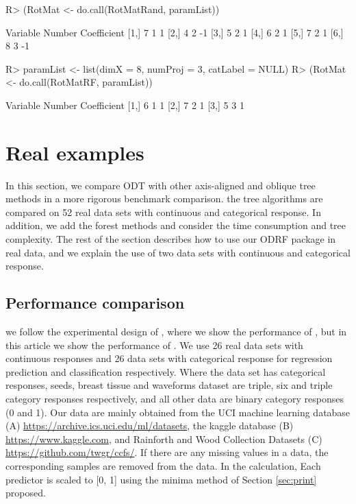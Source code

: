 \documentclass[nojss]{jss}
\numberwithin{equation}{section}
\begin{document}
\begin{Schunk}
\begin{Sinput}
R> (RotMat <- do.call(RotMatRand, paramList))
\end{Sinput}
\begin{Soutput}
     Variable Number Coefficient
[1,]        7      1           1
[2,]        4      2          -1
[3,]        5      2           1
[4,]        6      2           1
[5,]        7      2           1
[6,]        8      3          -1
\end{Soutput}
\begin{Sinput}
R> paramList <- list(dimX = 8, numProj = 3, catLabel = NULL)
R> (RotMat <- do.call(RotMatRF, paramList))
\end{Sinput}
\begin{Soutput}
     Variable Number Coefficient
[1,]        6      1           1
[2,]        7      2           1
[3,]        5      3           1
\end{Soutput}
\end{Schunk}

\section{Real examples} \label{sec:examples}
In this section, we compare ODT with other axis-aligned and oblique tree methods in a more rigorous benchmark comparison. the tree algorithms are compared on 52 real data sets with continuous and categorical response. In addition, we add the forest methods and consider the time consumption and tree complexity. The rest of the section describes how to use our ODRF package in real data, and we explain the use of two data sets with continuous and categorical response.

\subsection{Performance comparison}
we follow the experimental design of \cite{zhan2022consistency}, where we show the performance of  , but in this article we show the performance of . We use 26 real data sets with continuous responses  and 26 data sets with categorical response for regression prediction and classification respectively. Where the data set has categorical responses, seeds, breast tissue and waveforms dataset are triple, six and triple category responses respectively, and all other data are binary category responses (0 and 1). Our data are mainly obtained from the UCI machine learning database (A) \url{https://archive.ics.uci.edu/ml/datasets}, the kaggle database (B) \url{https://www.kaggle.com}, and Rainforth and Wood \cite{rainforth2015canonical} Collection Datasets (C) \url{https://github.com/twgr/ccfs/}.
If there are any missing values in a data, the corresponding samples are removed from the data. In the calculation, Each predictor is scaled to [0, 1] using the minima method of Section \ref{sec:print} proposed.
\end{document}
